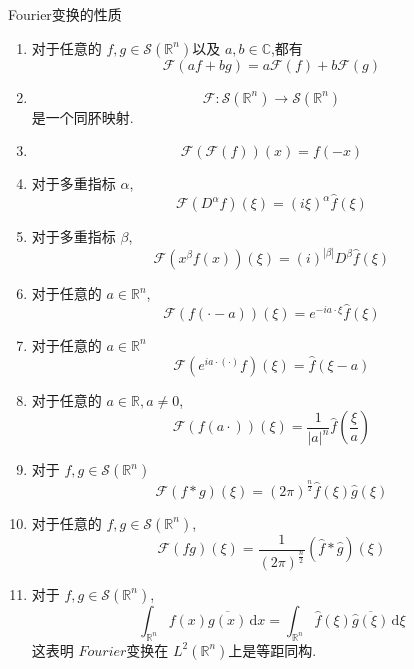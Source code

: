 \documentclass[../../main.tex]{subfiles}
\begin{document}
\begin{theorem}{Fourier变换的性质}
    \begin{enumerate}
        \item 对于任意的 \(  f,g\in \mathcal{S}\left( \mathbb{R} ^{n} \right)   \)以及 \(  a,b\in \mathbb{C}   \),都有 \[
        \mathcal{F}\left( af+ bg \right)= a \mathcal{F}\left( f \right)+ b \mathcal{F}\left( g \right)   
        \]  
        \item \[
        \mathcal{F}: \mathcal{S}\left( \mathbb{R} ^{n} \right)\to \mathcal{S}\left( \mathbb{R} ^{n} \right)  
        \]是一个同肧映射.
        \item \[
        \mathcal{F}\left( \mathcal{F}\left( f \right)  \right)\left( x \right)= f\left( -x \right)   
        \]
        \item 对于多重指标 \(  \alpha   \), \[
        \mathcal{F}\left( D^{\alpha }f \right)\left(  \xi  \right)= \left(i \xi   \right)^{\alpha } \hat{f}\left(  \xi  \right)  
        \] 
        \item 对于多重指标 \(  \beta   \), \[
        \mathcal{F}\left( x^{\beta }f\left( x \right)  \right)\left(  \xi  \right)=\left( i \right) ^{\left| \beta  \right| }D^{\beta } \hat{f}\left(  \xi  \right)    
        \]
        \item 对于任意的 \(  a \in \mathbb{R} ^{n}  \), \[
        \mathcal{F}\left( f\left( \cdot  -a \right)  \right)\left(  \xi  \right)= e^{-ia\cdot  \xi } \hat{f}\left(  \xi  \right)   
        \]
        \item  对于任意的 \(  a \in \mathbb{R} ^{n}  \) \[
        \mathcal{F}\left( e^{ia\cdot \left( \cdot  \right) }f \right)\left(  \xi  \right)= \hat{f}\left(  \xi -a \right)   
        \] 
        \item 对于任意的 \(  a \in \mathbb{R} ,a\neq 0  \), \[
        \mathcal{F}\left( f\left( a \cdot  \right)  \right)\left(  \xi  \right)= \frac{1 }{\left| a \right|^{n}  } \hat{f}\left( \frac{ \xi  }{a }  \right)    
        \] 
        \item 对于 \(  f,g \in \mathcal{S}\left( \mathbb{R} ^{n} \right)   \) \[
        \mathcal{F}\left( f*g \right) \left(  \xi  \right)= \left( 2\pi  \right)^{\frac{n }{2 } } \hat{f}\left(  \xi  \right)\hat{g}\left(  \xi  \right)    
        \] 
        \item  对于任意的 \(  f,g \in \mathcal{S}\left( \mathbb{R} ^{n} \right)   \), \[
        \mathcal{F}\left( fg \right)\left(  \xi  \right)=   \frac{1 }{\left( 2\pi  \right)^{\frac{n }{2 } }  }\left( \hat{f}*\hat{g} \right)\left(  \xi  \right)   
        \] 
        \item 对于 \(  f,g \in \mathcal{S}\left( \mathbb{R} ^{n} \right)   \), \[
        \int_{\mathbb{R} ^{n}} f\left( x \right) \overline{g\left( x \right) }\,\mathrm{d} x= \int_{\mathbb{R} ^{n}} \hat{f}\left(  \xi  \right) \overline{\hat{g}\left(  \xi  \right) }\,\mathrm{d}  \xi   
        \] 这表明 \(  Fourier  \)变换在 \(  L^{2}\left( \mathbb{R} ^{n} \right)   \)上是等距同构.  
    \end{enumerate}
    
\end{theorem}
\end{document}
